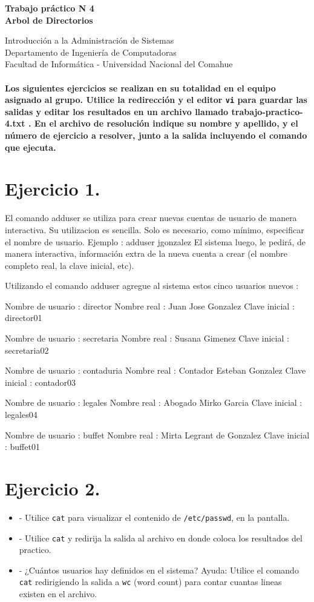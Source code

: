 \documentclass[12pt]{article}
\def\maketitle{

 \makeatletter
 {\color{bl} \centering \huge \sc \textbf{
Trabajo práctico N 4 \\
\large \vspace*{-8pt} \color{black} Arbol de Directorios
 \vspace*{8pt} }\par}
 \makeatother


 \makeatletter
 {\centering \small 
	Introducción a la Administración de Sistemas \\
 	Departamento de Ingeniería de Computadoras \\
 	Facultad de Informática - Universidad Nacional del Comahue \\
 	\vspace{20pt} }
 \makeatother

}
\begin{document}
\thispagestyle{empty}
\maketitle
\setlength{\parindent}{0pt}

\paragraph{Los siguientes ejercicios se realizan en su totalidad en el equipo asignado al grupo.
Utilice la redirección y el editor \texttt{vi} para guardar las salidas y editar los resultados 
en un archivo llamado trabajo-practico-4.txt . En el archivo de resolución indique su nombre y apellido, y el número de ejercicio a resolver, junto a la salida incluyendo el comando que ejecuta. }

\section{Ejercicio 1.}


El comando  adduser se utiliza para crear nuevas cuentas de usuario de manera interactiva.
Su utilizacion es sencilla. Solo es necesario, como mínimo, especificar el nombre de usuario. Ejemplo : adduser jgonzalez
El sistema luego, le pedirá, de manera interactiva, información extra de la nueva cuenta a crear (el nombre completo real, la clave inicial, etc).

Utilizando el comando adduser agregue al sistema estos cinco usuarios nuevos :

Nombre de usuario : director
Nombre real : Juan Jose Gonzalez
Clave inicial : director01

Nombre de usuario : secretaria
Nombre real : Susana Gimenez
Clave inicial : secretaria02

Nombre de usuario : contaduria
Nombre real : Contador Esteban Gonzalez
Clave inicial : contador03

Nombre de usuario : legales
Nombre real : Abogado Mirko Garcia 
Clave inicial : legales04

Nombre de usuario : buffet
Nombre real : Mirta Legrant de Gonzalez
Clave inicial : buffet01


\section{Ejercicio 2.}
\begin{itemize}
\item - Utilice \texttt{cat} para visualizar el contenido de \texttt{/etc/passwd}, en la pantalla.
\item - Utilice \texttt{cat} y redirija la salida al archivo en donde coloca los resultados del practico.
\item - ¿Cuántos usuarios hay definidos en el sistema?
Ayuda: Utilice el comando \texttt{cat} redirigiendo la salida a \texttt{wc} (word count) para contar cuantas lineas
existen en el archivo.
\end{itemize}
\end{document}
